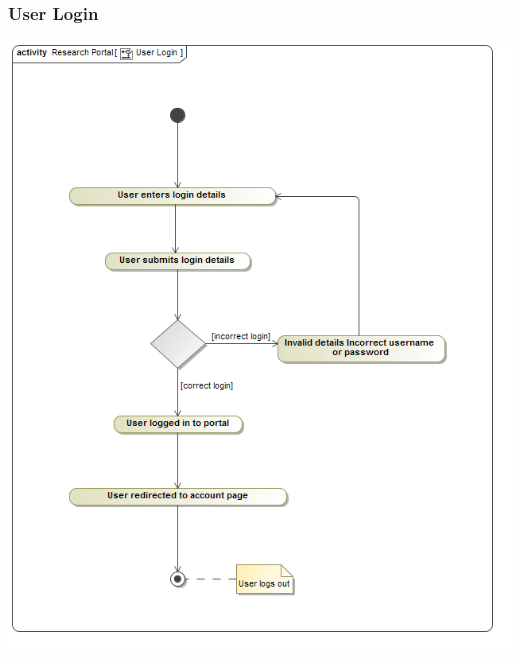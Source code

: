 \documentclass[hidelinks,a4paper,12pt]{article}
\begin{document}
		\subsubsection{User Login}
			\includegraphics[width=1\textwidth]{./Graphs/UserLogin.png}\\[0.4cm]
			
\end{document}
